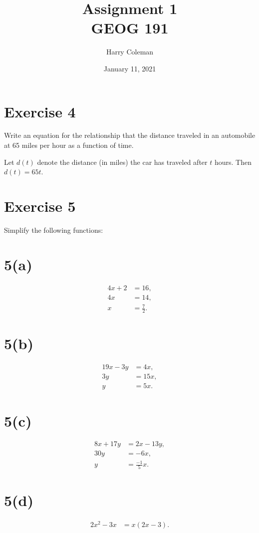 \documentclass[12pt]{article}
\title{Assignment 1\\
    \large GEOG 191
}
\author{Harry Coleman}
\date{January 11, 2021}
\newenvironment{problem}
    {\begin{lrbox}{\mybox}\begin{minipage}{0.98\textwidth}}
    {\end{minipage}\end{lrbox}\begin{center}\framebox[\textwidth]{\usebox{\mybox}}\end{center}}
\begin{document}
\maketitle

\section*{Exercise 4}
\begin{problem}
    Write an equation for the relationship that the distance traveled in an automobile at 65 miles per hour as a function of time.
\end{problem}

Let $d(t)$ denote the distance (in miles) the car has traveled after $t$ hours. Then $d(t) = 65t$.

\section*{Exercise 5}
\begin{problem}
    Simplify the following functions:
\end{problem}

\section*{5(a)}
\begin{align*}
    4x + 2 &= 16, \\
    4x &= 14, \\
    x &= \frac72.
\end{align*}

\section*{5(b)}
\begin{align*}
    19x - 3y &= 4x, \\
    3y &= 15x, \\
    y &= 5x.
\end{align*}

\section*{5(c)}
\begin{align*}
    8x + 17y &= 2x - 13y, \\
    30y &= -6x, \\
    y &= \frac{-1}{5} x.
\end{align*}

\section*{5(d)}
\begin{align*}
    2x^2 - 3x &= x(2x - 3).
\end{align*}
\end{document}
